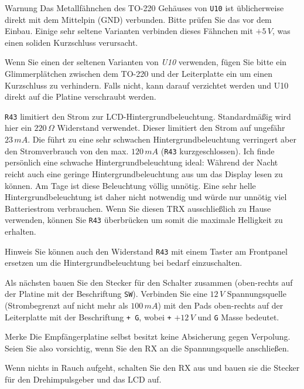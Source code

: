 \documentclass[10pt, a4paper,twoside]{scrartcl}
\newenvironment{remember}{\begin{bclogo}[couleur=blue!30,arrondi=.1,logo=\bccrayon,ombre=true]{Merke}}{\end{bclogo}}
\newenvironment{remark}{\begin{bclogo}[couleur=blue!30,arrondi=.1,logo=\bcinfo,ombre=true]{Hinweis}}{\end{bclogo}}
\newenvironment{warning}{\begin{bclogo}[couleur=red!30,arrondi=.1,logo=\bcattention,ombre=true]{Warnung}}{\end{bclogo}}
\begin{document}
\begin{warning}
Das Metallfähnchen des TO-220 Gehäuses von \texttt{U10} ist üblicherweise direkt mit dem Mittelpin (GND) verbunden. Bitte prüfen Sie das vor dem Einbau. Einige sehr seltene Varianten verbinden dieses Fähnchen mit $+5\,V$, was einen soliden Kurzschluss verursacht.
\end{warning}

Wenn Sie einen der seltenen Varianten von \emph{U10} verwenden, fügen Sie bitte ein Glimmerplätchen zwischen dem TO-220 und der Leiterplatte ein um einen Kurzschluss zu verhindern. Falls nicht, kann darauf verzichtet werden und U10 direkt auf die Platine verschraubt werden.

 \texttt{R43} limitiert den Strom zur LCD-Hintergrundbeleuchtung. Standardmäßig wird hier ein $220\,\Omega$ Widerstand verwendet. Dieser limitiert den Strom auf ungefähr $23\,mA$. Die führt zu eine sehr schwachen Hintergrundbeleuchtung verringert aber den Stromverbrauch von den max. $120\,mA$ (\texttt{R43} kurzgeschlossen). Ich finde persönlich eine schwache Hintergrundbeleuchtung ideal: Während der Nacht reicht auch eine geringe Hintergrundbeleuchtung aus um das Display lesen zu können. Am Tage ist diese Beleuchtung völlig unnötig. Eine sehr helle Hintergrundbeleuchtung ist daher nicht notwendig und würde nur unnötig viel Batteriestrom verbrauchen. Wenn Sie diesen TRX ausschließlich zu Hause verwenden, können Sie \texttt{R43} überbrücken um somit die maximale Helligkeit zu erhalten.
 
\begin{remark} 
 Sie können auch den Widerstand \texttt{R43} mit einem Taster am Frontpanel ersetzen um die Hintergrundbeleuchtung bei bedarf einzuschalten.
\end{remark}

 Als nächsten bauen Sie den Stecker für den Schalter zusammen (oben-rechts auf der Platine mit der Beschriftung \texttt{SW}). Verbinden Sie eine $12\,V$ Spannungsquelle (Strombegrenzt auf nicht mehr als $100\,mA$) mit den Pads oben-rechts auf der Leiterplatte mit der Beschriftung \texttt{+ G}, wobei \texttt{+} $+12\,V$ und \texttt{G} Masse bedeutet.

\begin{remember}
 Die Empfängerplatine selbst besitzt keine Absicherung gegen Verpolung. Seien Sie also vorsichtig, wenn Sie den RX an die Spannungsquelle anschließen.
\end{remember}

 Wenn nichts in Rauch aufgeht, schalten Sie den RX aus und bauen sie die Stecker für den Drehimpulsgeber und das LCD auf.  
\end{document}
